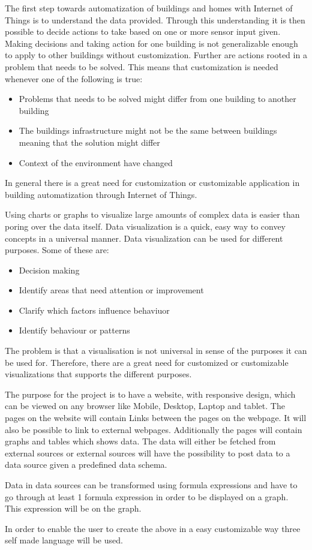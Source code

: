 The first step towards automatization of buildings and homes with Internet of Things is to understand the data provided. 
Through this understanding it is then possible to decide actions to take based on one or more sensor input given. 
Making decisions and taking action for one building is not generalizable enough to apply to other buildings without customization. 
Further are actions rooted in a problem that needs to be solved. 
This means that customization is needed whenever one of the following is true:
\begin{itemize}
\item Problems that needs to be solved might differ from one building to  another building
\item The buildings infrastructure might not be the same between buildings meaning that the solution might differ
\item Context of the environment have changed
\end{itemize}

In general there is a great need for customization or customizable application in building  automatization through Internet of Things.

Using charts or graphs to visualize large amounts of complex data is easier than poring over the data itself. 
Data visualization is a quick, easy way to convey concepts in a universal manner. Data visualization can be used for different purposes. 
Some of these are:
\begin{itemize}
\item Decision making
\item Identify areas that need attention or improvement
\item Clarify which factors influence behaviuor
\item Identify behaviour or patterns
\end{itemize}

The problem is that a visualisation is not universal in sense of the purposes it can be used for. 
Therefore, there are a great need for customized or customizable visualizations that supports the different purposes. 

The purpose for the project is to have a website, with responsive design, which can be viewed on any browser like Mobile, Desktop, Laptop and tablet. 
The pages on the website will contain Links between the pages on the webpage. 
It will also be possible to link to external webpages. 
Additionally the pages will contain graphs and tables which shows data. 
The data will either be fetched from external sources or external sources will have the possibility to post data to a data source given a predefined data schema. 

Data in data sources can be transformed using formula expressions and have to go through at least 1 formula expression in order to be displayed on a graph. 
This expression will be on the graph. 

In order to enable the user to create the above in a easy customizable way three self made language will be used.
